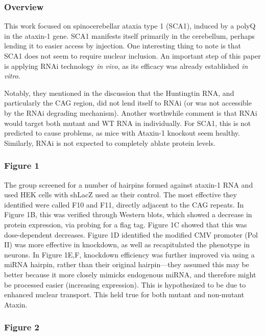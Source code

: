 \documentclass[12pt]{report}
\begin{document}
\subsubsection{Overview}

This work focused on spinocerebellar ataxia type 1 (SCA1), induced by a polyQ in the ataxin-1 gene. SCA1 manifests itself primarily in the cerebellum, perhaps lending it to easier access by injection. One interesting thing to note is that SCA1 does not seem to require nuclear inclusion. An important step of this paper is applying RNAi technology \textit{in vivo}, as its efficacy was already established \textit{in vitro}.\newline

Notably, they mentioned in the discussion that the Huntingtin RNA, and particularly the CAG region, did not lend itself to RNAi (or was not accessible by the RNAi degrading mechanism). Another worthwhile comment is that RNAi would target both mutant and WT RNA in individually. For SCA1, this is not predicted to cause problems, as mice with Ataxin-1 knockout seem healthy. Similarly, RNAi is not expected to completely ablate protein levels. 


\subsubsection{Figure 1}

The group screened for a number of hairpins formed against ataxin-1 RNA and used HEK cells with shLacZ used as their control. The most effective they identified were called F10 and F11, directly adjacent to the CAG repeats. In Figure 1B, this was verified through Western blots, which showed a decrease in protein expression, via probing for a flag tag. Figure 1C showed that this was dose-dependent decreases. Figure 1D identified the modified CMV promoter (Pol II) was more effective in knockdown, as well as recapitulated the phenotype in neurons. In Figure 1E,F, knockdown efficiency was further improved via using a miRNA hairpin, rather than their original hairpin---they assumed this may be better because it more closely mimicks endogenous miRNA, and therefore might be processed easier (increasing expression). This is hypothesized to be due to enhanced nuclear transport. This held true for both mutant and non-mutant Ataxin. 

\subsubsection{Figure 2}
\end{document}

